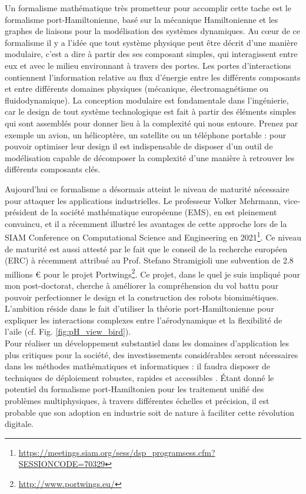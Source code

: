 \documentclass[12pt, french]{article}
\begin{document}
Un formalisme mathématique très prometteur pour accomplir cette tache est le formalisme port-Hamiltonienne, basé sur la mécanique Hamiltonienne et les graphes de liaisons pour la modélisation des systèmes dynamiques. Au c\oe{}ur de ce formalisme il y a l'idée que tout système physique peut être décrit d'une manière modulaire, c'est a dire à partir des ses composant simples, qui interagissent entre eux et avec le milieu environnant à travers des portes. Les portes d'interactions contiennent l'information relative au flux d'énergie entre les différents composants et entre différents domaines physiques (mécanique, électromagnétisme ou fluidodynamique). La conception modulaire est fondamentale dans l'ingénierie, car le design de tout système technologique est fait à partir des éléments simples qui sont assemblés pour donner lieu à la complexité qui nous entoure. Prenez par exemple un avion, un hélicoptère, un satellite ou un téléphone portable : pour pouvoir optimiser leur design il est indispensable de disposer d'un outil de modélisation capable de décomposer la complexité d'une manière à retrouver les différents composants clés.



Aujourd'hui ce formalisme a désormais atteint le niveau de maturit\'e nécessaire pour attaquer les applications industrielles. Le professeur Volker Mehrmann, vice-président de la société mathématique européenne (EMS), en est pleinement convaincu, et il a récemment illustré les avantages de cette approche  lors de la SIAM Conference on Computational Science and Engineering en 2021\footnote{\url{https://meetings.siam.org/sess/dsp_programsess.cfm?SESSIONCODE=70329}}. Ce niveau de maturit\'e est aussi attesté par le fait que le conseil de la recherche européen (ERC) \`a récemment attribu\'e au Prof. Stefano Stramigioli une subvention de 2.8 millions \euro{} pour le projet Portwings\footnote{\url{http://www.portwings.eu/}}. Ce projet, dans le quel je suis impliqu\'e pour mon post-doctorat, cherche \`a améliorer la compréhension du vol battu pour pouvoir perfectionner le design et la construction des robots biomimétiques. L'ambition réside dans le fait d'utiliser la théorie port-Hamiltonienne pour expliquer les interactions complexes entre l'aérodynamique et la flexibilit\'e de l'aile (cf. Fig. \ref{fig:pH_view_bird}). \\

Pour réaliser un développement substantiel dans les domaines d'application les plus critiques pour la société, des investissements considérables seront nécessaires dans les méthodes mathématiques et informatiques : il faudra disposer  de techniques de déploiement robustes, rapides et accessibles \cite{niederer2021}. Étant donné le potentiel du formalisme port-Hamiltonien pour les traitement unifié des problèmes multiphysiques, \`a travers différentes échelles et précision, il est probable que son adoption en industrie soit de nature \`a faciliter cette révolution digitale. 
\end{document}
